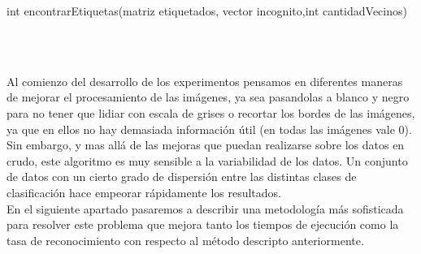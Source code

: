 \begin{algorithm}
\begin{algorithmic}[1]\parskip=1mm
\caption{int encontrarEtiquetas(matriz etiquetados, vector incognito,int cantidadVecinos)}
\ENDFOR
{}
\ENDWHILE\\
\end{algorithmic}
\end{algorithm}
\\
Al comienzo del desarrollo de los experimentos pensamos en diferentes maneras de mejorar el procesamiento de las imágenes, ya sea pasandolas a blanco y negro para no tener que lidiar con escala de grises o recortar los bordes de las imágenes, ya que en ellos no hay demasiada información útil (en todas las imágenes vale 0).
\\
Sin embargo, y mas allá de las mejoras que puedan realizarse sobre los datos en crudo, este algoritmo es muy sensible a la variabilidad de los datos. Un conjunto de datos con un cierto grado de dispersión entre las distintas clases de clasificación hace empeorar rápidamente los resultados.
\\
En el siguiente apartado pasaremos a describir una metodología más sofisticada para resolver este problema que mejora tanto los tiempos de ejecución como la tasa de reconocimiento con respecto al método descripto anteriormente.

